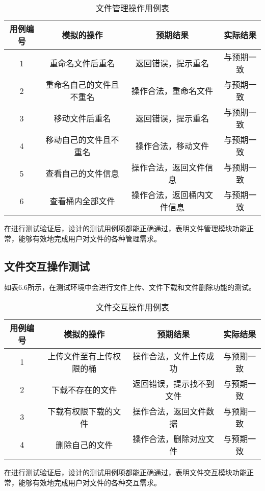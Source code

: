 \begin{table}[h]
  \centering
  \caption{文件管理操作用例表}
  \begin{tabular}{cccc}
    \toprule
    用例编号 & 模拟的操作   & 预期结果  & 实际结果 \\
    \midrule
    1 & 重命名文件后重名          & 返回错误，提示重名      & 与预期一致\\
    2 & 重命名自己的文件且不重名   & 操作合法，重命名文件     & 与预期一致\\
    3 & 移动文件后重名            & 返回错误，提示重名      & 与预期一致\\
    4 & 移动自己的文件且不重名     & 操作合法，移动文件       & 与预期一致\\
    5 & 查看自己的文件信息        & 操作合法，返回文件信息    & 与预期一致\\
    6 & 查看桶内全部文件          & 操作合法，返回桶内文件信息 & 与预期一致\\
    \bottomrule
  \end{tabular}
\end{table}

在进行测试验证后，设计的测试用例项都能正确通过，表明文件管理模块功能正常，能够有效地完成用户对文件的各种管理需求。

\subsection{文件交互操作测试}

如表6.6所示，在测试环境中会进行文件上传、文件下载和文件删除功能的测试。

\begin{table}[h]
  \centering
  \caption{文件交互操作用例表}
  \begin{tabular}{cccc}
    \toprule
    用例编号 & 模拟的操作   & 预期结果 & 实际结果  \\
    \midrule
    1 & 上传文件至有上传权限的桶   & 操作合法，文件上传成功    & 与预期一致\\
    2 & 下载不存在的文件          & 返回错误，提示找不到文件  & 与预期一致\\
    3 & 下载有权限下载的文件       & 操作合法，返回文件数据   & 与预期一致\\
    4 & 删除自己的文件            & 操作合法，删除对应文件   & 与预期一致\\
    \bottomrule
  \end{tabular}
\end{table}

在进行测试验证后，设计的测试用例项都能正确通过，表明文件交互模块功能正常，能够有效地完成用户对文件的各种交互需求。


